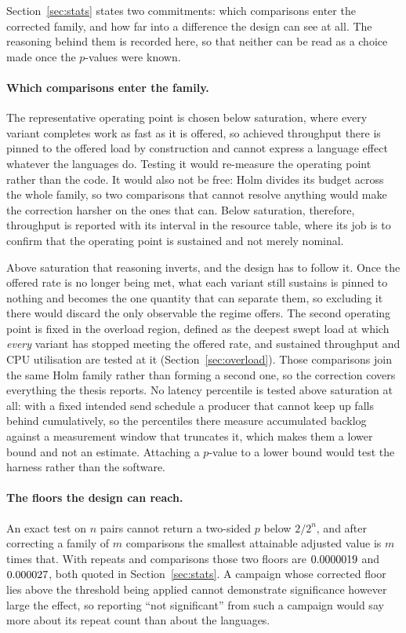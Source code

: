 \documentclass[english,twoside,openright,a4paper,censored,csm,software-track-2020]{HYthesisML}
\begin{document}
\begin{appendices}
Section~\ref{sec:stats} states two commitments: which comparisons enter the corrected family, and
how far into a difference the design can see at all. The reasoning behind them is recorded here,
so that neither can be read as a choice made once the $p$-values were known.

\paragraph{Which comparisons enter the family.}
The representative operating point is chosen below saturation, where every variant completes work
as fast as it is offered, so achieved throughput there is pinned to the offered load by
construction and cannot express a language effect whatever the languages do. Testing it would
re-measure the operating point rather than the code. It would also not be free: Holm divides its
budget across the whole family, so two comparisons that cannot resolve anything would make the
correction harsher on the ones that can. Below saturation, therefore, throughput is reported with
its interval in the resource table, where its job is to confirm that the operating point is
sustained and not merely nominal.

Above saturation that reasoning inverts, and the design has to follow it. Once the offered rate is
no longer being met, what each variant still sustains is pinned to nothing and becomes the one
quantity that can separate them, so excluding it there would discard the only observable the
regime offers. The second operating point is fixed in the overload region, defined as the deepest
swept load at which \emph{every} variant has stopped meeting the offered rate, and sustained
throughput and CPU utilisation are tested at it (Section~\ref{sec:overload}). Those comparisons
join the same Holm family rather than forming a second one, so the correction covers everything
the thesis reports. No latency percentile is tested above saturation at all: with a fixed intended
send schedule a producer that cannot keep up falls behind cumulatively, so the percentiles there
measure accumulated backlog against a measurement window that truncates it, which makes them a
lower bound and not an estimate. Attaching a $p$-value to a lower bound would test the harness
rather than the software.

\paragraph{The floors the design can reach.}
An exact test on $n$ pairs cannot return a two-sided $p$ below $2/2^{n}$, and after correcting a
family of $m$ comparisons the smallest attainable adjusted value is $m$ times that. With
\NRepeats{} repeats and \NTests{} comparisons those two floors are $0.0000019$ and
$0.000027$, both quoted in Section~\ref{sec:stats}. A campaign whose corrected floor lies
above the threshold being applied cannot demonstrate significance however large the effect, so
reporting ``not significant'' from such a campaign would say more about its repeat count than
about the languages.


\end{appendices}
\end{document}
